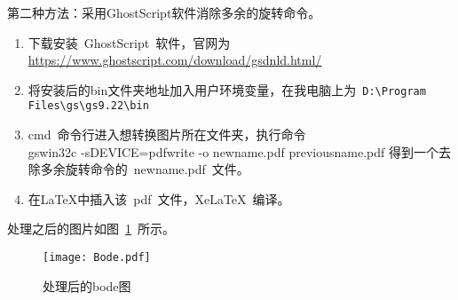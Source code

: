 第二种方法：采用GhostScript软件消除多余的旋转命令。
\begin{enumerate}
    \item 下载安装~GhostScript~软件，官网为\url{https://www.ghostscript.com/download/gsdnld.html/}
        
    \item 将安装后的bin文件夹地址加入用户环境变量，在我电脑上为~\verb|D:|\verb|\Program Files|\verb|\gs|\verb|\gs9.22|\verb|\bin|
	
    \item cmd~命令行进入想转换图片所在文件夹，执行命令\\gswin32c -sDEVICE=pdfwrite -o newname.pdf  previousname.pdf
              得到一个去除多余旋转命令的~newname.pdf~文件。

    \item 在\LaTeX{}中插入该~pdf~文件，XeLaTeX~编译。
\end{enumerate}

处理之后的图片如图~\ref{Bode}~所示。
\begin{figure}[H] 
  \centering
  \texttt{[image: Bode.pdf]}
  \caption{处理后的bode图}
  \label{Bode}
\end{figure}





